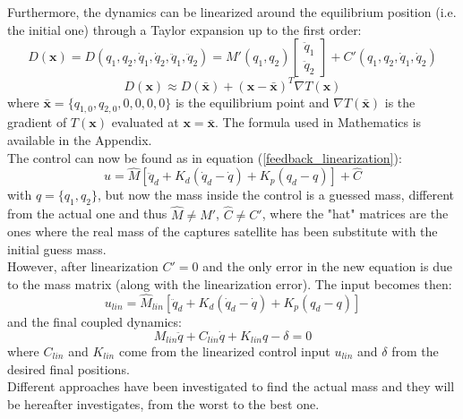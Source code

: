 \documentclass[a4paper,12pt,oneside]{report}
\begin{document}
Furthermore, the dynamics can be linearized around the equilibrium position (i.e. the initial one) through a Taylor expansion up to the first order:
\begin{equation}
  D(\textbf{x})=D(q_1,q_2,\dot{q}_1,\dot{q}_2,\ddot{q}_1,\ddot{q}_2)=M'(q_1,q_2)\begin{bmatrix}
    \ddot{q}_1\\
    \ddot{q}_2
  \end{bmatrix}+C'(q_1,q_2,\dot{q}_1,\dot{q}_2)
\end{equation}
\begin{equation}
  D(\textbf{x})\approx D(\bar{\textbf{x}})+(\textbf{x}-\bar{\textbf{x}})^T\nabla T(\textbf{x})
\end{equation}
where $\bar{\textbf{x}}=\{q_{1,0},q_{2,0},0,0,0,0\}$ is the equilibrium point and $\nabla T(\bar{\textbf{x}})$ is the gradient of $T(\textbf{x})$ evaluated at $\textbf{x}=\bar{\textbf{x}}$. The formula used in Mathematics is available in the Appendix.\\
The control can now be found as in equation (\ref{feedback_linearization}):
\begin{equation}
  u=\hat{M}[\ddot{q}_d+K_d(\dot{q}_d-\dot{q})+K_p(q_d-q)]+\hat{C}
\end{equation}
with $q=\{q_1,q_2\}$, but now the mass inside the control is a guessed mass, different from the actual one and thus $\hat{M}\neq M'$, $\hat{C}\neq C'$, where the "hat" matrices are the ones where the real mass of the captures satellite has been substitute with the initial guess mass.\\
However, after linearization $C'=0$ and the only error in the new equation is due to the mass matrix (along with the linearization error). The input becomes then:
\begin{equation}
  u_{lin}=\hat{M}_{lin}[\ddot{q}_d+K_d(\dot{q}_d-\dot{q})+K_p(q_d-q)]
\end{equation}
and the final coupled dynamics:
\begin{equation}
  M_{lin}\ddot{q}+C_{lin}\dot{q}+K_{lin}q-\delta=0
\end{equation}
where $C_{lin}$ and $K_{lin}$ come from the linearized control input $u_{lin}$ and $\delta$ from the desired final positions.\\
Different approaches have been investigated to find the actual mass and they will be hereafter investigates, from the worst to the best one.
\newpage
\end{document}
